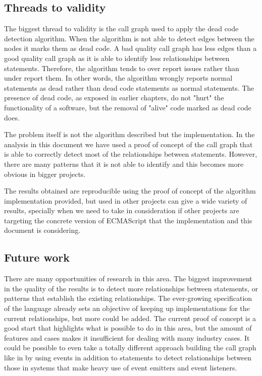 \documentclass{uvamscse}
\begin{document}
\subsection{Threads to validity}
The biggest thread to validity is the call graph used to apply the dead code detection algorithm. When the algorithm is not able to detect edges between the nodes it marks them as dead code. A bad quality call graph has less edges than a good quality call graph as it is able to identify less relationships between statements. Therefore, the algorithm tends to over report issues rather than under report them. In other words, the algorithm wrongly reports normal statements as dead rather than dead code statements as normal statements. The presence of dead code, as exposed in earlier chapters, do not "hurt" the functionality of a software, but the removal of "alive" code marked as dead code does.

The problem itself is not the algorithm described but the implementation. In the analysis in this document we have used a proof of concept of the call graph that is able to correctly detect most of the relationships between statements. However, there are many patterns that it is not able to identify and this becomes more obvious in bigger projects.

The results obtained are reproducible using the proof of concept of the algorithm implementation provided, but used in other projects can give a wide variety of results, specially when we need to take in consideration if other projects are targeting the concrete version of ECMAScript that the implementation and this document is considering. 

\subsection{Future work}
There are many opportunities of research in this area. The biggest improvement in the quality of the results is to detect more relationships between statements, or patterns that establish the existing relationships. The ever-growing specification of the language already sets an objective of keeping up implementations for the current relationships, but more could be added. The current proof of concept is a good start that highlights what is possible to do in this area, but the amount of features and cases makes it insufficient for dealing with many industry cases. It could be possible to even take a totally different approach building the call graph like in  \cite{MadsenMagnus2015Saoe} by using events in addition to statements to detect relationships between those in systems that make heavy use of event emitters and event listeners.
\end{document}
